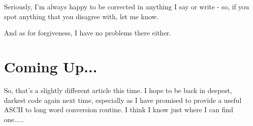 Seriously, I'm always happy to be corrected in anything I say or
    write -{} so, if you spot anything that you disagree with, let me
    know.

And as for forgiveness, I have no problems there either.

\section{Coming Up...}
\label{ch17-the-end}%

So, that's a slightly different article this time. I hope to be back
    in deepest, darkest code again next time, especially as I have promised to
    provide a useful ASCII to long word conversion routine. I think I know
    just where I can find one.....


